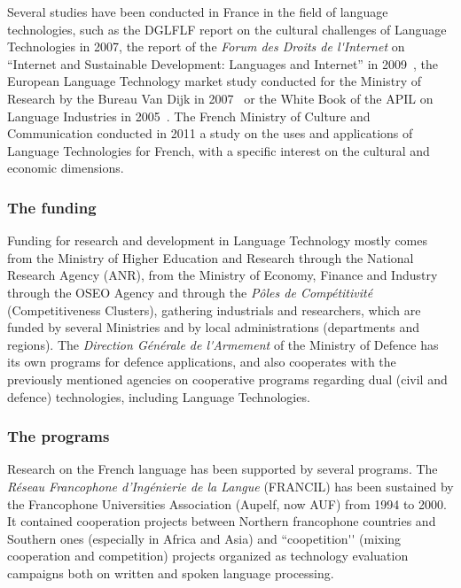 \documentclass[]{../metanetpaper}
\begin{document}
\begin{multicols}{2}
Several studies have been conducted in France in the field of language
technologies, such as the DGLFLF report on the cultural challenges of
Language Technologies in 2007\cite{dglflf07}, the report of the {\em Forum des Droits de
l{\mbox '}Internet} on ``Internet and Sustainable Development: Languages and Internet'' in 2009~\cite{droitsinternet07}, the
European Language Technology market study conducted for the Ministry
of Research by the Bureau Van Dijk in 2007~\cite{vandijk07} or the White Book of the
APIL on Language Industries in 2005~\cite{apil05}. The French Ministry of Culture
and Communication conducted in 2011 a study on the uses and
applications of Language Technologies for French, with a specific
interest on the cultural and economic dimensions.

\subsubsection{The funding}
Funding for research and development in Language Technology mostly
comes from the Ministry of Higher Education and Research through the
National Research Agency (ANR), from the Ministry of Economy, Finance
and Industry through the OSEO Agency and through the {\em Pôles de
Compétitivité} (Competitiveness Clusters), gathering industrials and
researchers, which are funded by several Ministries and by local
administrations (departments and regions). The {\em Direction Générale de
l{\mbox '}Armement} of the Ministry of Defence has its own programs for defence
applications, and also cooperates with the previously mentioned
agencies on cooperative programs regarding dual (civil and defence)
technologies, including Language Technologies.

\subsubsection{The programs}
Research on the French language has been supported by several
programs. The {\em Réseau Francophone d’Ingénierie de la Langue} (FRANCIL)
has been sustained by the Francophone Universities Association
(Aupelf, now AUF) from 1994 to 2000. It contained cooperation projects
between Northern francophone countries and Southern ones (especially
in Africa and Asia) and ``coopetition{\mbox '}{\mbox '} (mixing cooperation and
competition) projects organized as technology evaluation campaigns
both on written and spoken language processing.


\end{multicols}
\end{document}
